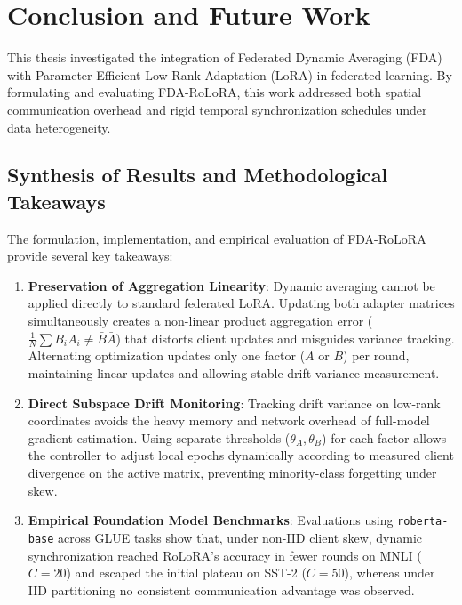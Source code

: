 \chapter{Conclusion and Future Work}
\label{chap:conclusion}

This thesis investigated the integration of Federated Dynamic Averaging (FDA) with Parameter-Efficient Low-Rank Adaptation (LoRA) in federated learning. By formulating and evaluating FDA-RoLoRA, this work addressed both spatial communication overhead and rigid temporal synchronization schedules under data heterogeneity.

\section{Synthesis of Results and Methodological Takeaways}
\label{sec:synthesis_results}

The formulation, implementation, and empirical evaluation of FDA-RoLoRA provide several key takeaways:

\begin{enumerate}
    \item \textbf{Preservation of Aggregation Linearity}: Dynamic averaging cannot be applied directly to standard federated LoRA. Updating both adapter matrices simultaneously creates a non-linear product aggregation error ($\frac{1}{N}\sum B_i A_i \neq \bar{B}\bar{A}$) that distorts client updates and misguides variance tracking. Alternating optimization updates only one factor ($A$ or $B$) per round, maintaining linear updates and allowing stable drift variance measurement.
    
    \item \textbf{Direct Subspace Drift Monitoring}: Tracking drift variance on low-rank coordinates avoids the heavy memory and network overhead of full-model gradient estimation. Using separate thresholds ($\theta_A, \theta_B$) for each factor allows the controller to adjust local epochs dynamically according to measured client divergence on the active matrix, preventing minority-class forgetting under skew.
    
    \item \textbf{Empirical Foundation Model Benchmarks}: Evaluations using \texttt{roberta-base} across GLUE tasks show that, under non-IID client skew, dynamic synchronization reached RoLoRA's accuracy in fewer rounds on MNLI ($C=20$) and escaped the initial plateau on SST-2 ($C=50$), whereas under IID partitioning no consistent communication advantage was observed.
\end{enumerate}

